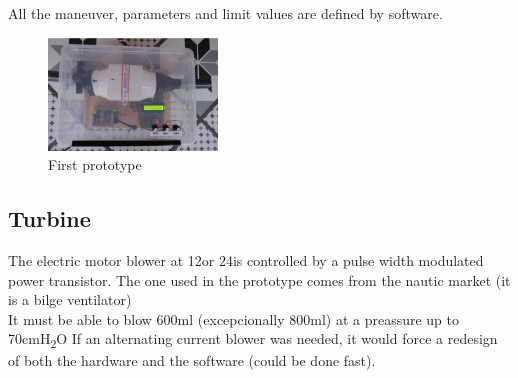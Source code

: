     All the maneuver, parameters and limit values are defined by software.
    \begin{figure}
        \centering
        \includegraphics[width=0.4\textwidth]{Img/prototipo-1.PNG}
        \caption{First prototype}
    \end{figure}
    
\subsection{Turbine}
    The electric motor blower at 12\Vcc or 24\Vcc is controlled by a pulse width modulated power transistor. The one used in the prototype comes from the nautic market (it is a bilge ventilator)\\    
    It must be able to blow 600ml (excepcionally 800ml) at a preassure up to 70cmH\textsubscript{2}O
    If an alternating current blower was needed, it would force a redesign of both the hardware and the software (could be done fast).

